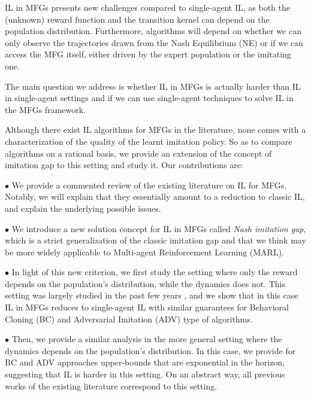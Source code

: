 \documentclass{article}
\begin{document}
IL in MFGs presents new challenges compared to single-agent IL, as both the (unknown) reward function and the transition kernel can depend on the population distribution. Furthermore, algorithms will depend on whether we can only observe the trajectories drawn from the Nash Equilibrium (NE) or if we can access the MFG itself, either driven by the expert population or the imitating one.


% 
The main question we address is whether IL in MFGs is actually harder than IL in single-agent settings and if we can use single-agent techniques to solve IL in the MFGs framework. 

Although there exist IL algorithms for MFGs in the literature, none comes with a characterization of the quality of the learnt imitation policy. So as to compare algorithms on a rational basis, we provide an extension of the concept of imitation gap to this setting and study it. Our contributions are:

$\bullet$ We provide a commented review of the existing literature on IL for MFGs. Notably, we will explain that they essentially amount to a reduction to classic IL, and explain the underlying possible issues.

$\bullet$ We introduce a new solution concept for IL in MFGs called \textit{Nash imitation gap}, which is a strict generalization of the classic imitation gap and that we think may be more widely  applicable to Multi-agent Reinforcement Learning (MARL).

$\bullet$ In light of this new criterion, we first study the setting where only the reward depends on the population's distribution, while the dynamics does not. 
This setting was largely studied in the past few years \cite{gomes2010discrete,cardaliaguet2015mean,achdou2019mean,geist2022concave,perolat2022scaling}, and we show that in this case IL in MFGs reduces to single-agent IL with similar guarantees for Behavioral Cloning (BC) and Adversarial Imitation (ADV) %
type of algorithms.

$\bullet$ Then, we provide a similar analysis in the more general setting where the dynamics depends on the population's distribution. In this case, we provide for BC and ADV approaches upper-bounds that are exponential in the horizon, suggesting that IL is harder in this setting. On an abstract way,  all previous works of the existing literature correspond to this setting.
\end{document}
